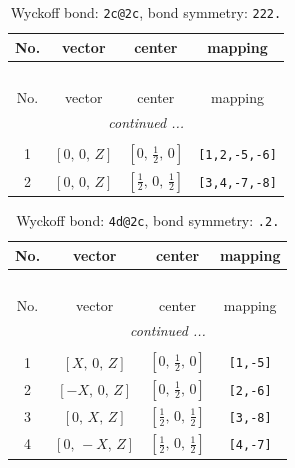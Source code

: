 \documentclass[fleqn,8pt]{jsarticle}
\begin{document}
\begin{longtable}{cccc}
\caption{Wyckoff bond: {\tt 2c@2c}, bond symmetry: {\tt 222.}}
 \\
 \hline \hline
No. & vector & center & mapping \\ \hline \endfirsthead

\multicolumn{3}{l}{\tablename\ \thetable{}} \\
 \hline \hline
No. & vector & center & mapping \\ \hline \endhead

 \hline \hline
\multicolumn{3}{r}{\footnotesize\it continued ...} \\ \endfoot

 \hline \hline
\multicolumn{3}{r}{} \\ \endlastfoot

1 & $\left[ 0,\, 0,\, Z \right]$ & $\left[ 0,\, \frac{1}{2},\, 0 \right]$ & {\tt [1,2,-5,-6]} \\ \hline
2 & $\left[ 0,\, 0,\, Z \right]$ & $\left[ \frac{1}{2},\, 0,\, \frac{1}{2} \right]$ & {\tt [3,4,-7,-8]} \\
\end{longtable}
\renewcommand{\arraystretch}{1.2}
\begin{longtable}{cccc}
\caption{Wyckoff bond: {\tt 4d@2c}, bond symmetry: {\tt .2.}}
 \\
 \hline \hline
No. & vector & center & mapping \\ \hline \endfirsthead

\multicolumn{3}{l}{\tablename\ \thetable{}} \\
 \hline \hline
No. & vector & center & mapping \\ \hline \endhead

 \hline \hline
\multicolumn{3}{r}{\footnotesize\it continued ...} \\ \endfoot

 \hline \hline
\multicolumn{3}{r}{} \\ \endlastfoot

1 & $\left[ X,\, 0,\, Z \right]$ & $\left[ 0,\, \frac{1}{2},\, 0 \right]$ & {\tt [1,-5]} \\ \hline
2 & $\left[ - X,\, 0,\, Z \right]$ & $\left[ 0,\, \frac{1}{2},\, 0 \right]$ & {\tt [2,-6]} \\ \hline
3 & $\left[ 0,\, X,\, Z \right]$ & $\left[ \frac{1}{2},\, 0,\, \frac{1}{2} \right]$ & {\tt [3,-8]} \\ \hline
4 & $\left[ 0,\, - X,\, Z \right]$ & $\left[ \frac{1}{2},\, 0,\, \frac{1}{2} \right]$ & {\tt [4,-7]} \\
\end{longtable}
\end{document}
